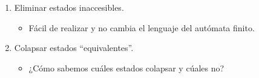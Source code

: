\begin{enumerate}
    \item Eliminar estados inaccesibles.
          \begin{itemize}
              \item Fácil de realizar y no cambia el lenguaje del autómata finito.
          \end{itemize}
    \item Colapsar estados ``equivalentes''.
          \begin{itemize}
              \item ¿Cómo sabemos cuáles estados colapsar y cúales no?
          \end{itemize}
\end{enumerate}


